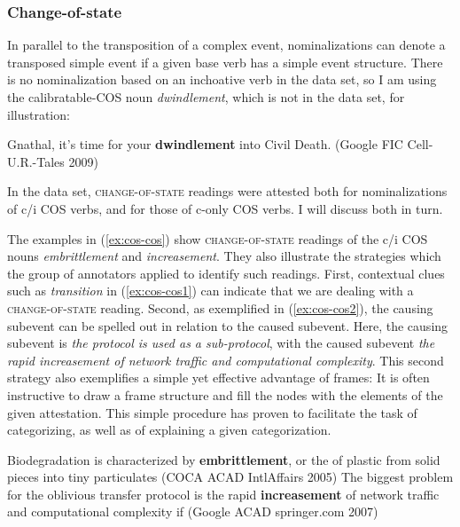 \subsubsection{{Change-of-state}}
In parallel to the transposition of a complex event, nominalizations can denote a transposed simple event if a given base verb has a simple event structure.
There is no nominalization based on an inchoative verb in the data set, so I am using the calibratable-COS noun \textit{dwindlement}, which is not in the data set, for illustration: 

\begin{exe}
  \ex \label{ex:cos.dwindlement} Gnathal, it's time for your \textbf{dwindlement} into Civil Death. {\small(Google FIC Cell-U.R.-Tales 2009)}
\end{exe}

\noindent In the data set, \textsc{change-of-state} readings were attested both for nominalizations of c/i COS verbs, and for those of c-only COS verbs. I will discuss both in turn.

The examples in (\ref{ex:cos-cos}) show \textsc{change-of-state} readings of the c/i COS nouns \textit{embrittlement} and \textit{increasement}. They also illustrate the strategies which the group of annotators applied to identify such readings. First, contextual clues such as \textit{transition} in (\ref{ex:cos-cos1}) can indicate that we are dealing with a \textsc{change-of-state} reading. Second, as exemplified in (\ref{ex:cos-cos2}), the causing subevent can be spelled out in relation to the caused subevent. Here, the causing subevent is \textit{the protocol is used as a sub-protocol}, with the caused subevent \textit{the rapid increasement of network traffic and computational complexity}. This second strategy also exemplifies a simple yet effective advantage of frames: It is often instructive to draw a frame structure and fill the nodes with the elements of the given attestation. This simple procedure has proven to facilitate the task of categorizing, as well as of explaining a given categorization. 

\begin{exe}
  \ex \label{ex:cos-cos} 
  \begin{xlist}
    \ex \label{ex:cos-cos1} Biodegradation is characterized by \textbf{embrittlement}, or the  of plastic from solid pieces into tiny particulates {\small(\acs{COCA} ACAD IntlAffairs 2005)}
    \ex \label{ex:cos-cos2} The biggest problem for the oblivious transfer protocol is the rapid \textbf{increasement} of network traffic and computational complexity if  {\small(Google ACAD springer.com 2007)}
  \end{xlist}
\end{exe}

